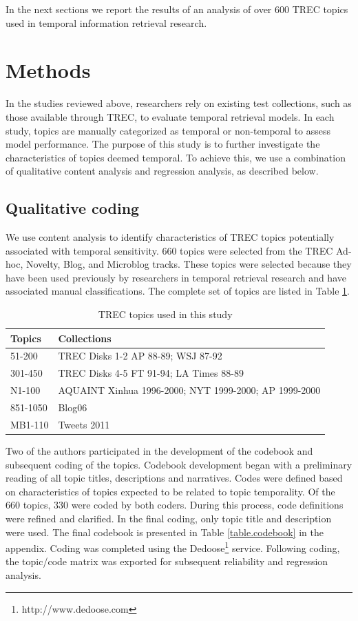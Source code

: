 \documentclass{sig-alternate}
\begin{document}
In the next sections we report the results of an analysis of over 600 TREC topics used in temporal information retrieval research. 

\section{Methods}

In the studies reviewed above, researchers rely on existing test collections, such as those available through TREC, to evaluate temporal retrieval models. In each study, topics are manually categorized as temporal or non-temporal to assess model performance. The purpose of this study is to further investigate the characteristics of topics deemed temporal. To achieve this, we use a combination of qualitative content analysis and regression analysis, as described below.

\subsection{Qualitative coding}
We use content analysis \cite{Krippendorf1980} to identify characteristics of TREC topics potentially associated with temporal sensitivity. 660 topics were selected from the TREC Ad-hoc, Novelty, Blog, and Microblog tracks. These topics were selected because they have been used previously by researchers in temporal retrieval research and have associated manual classifications. The complete set of topics are listed in Table \ref{table.topics}.

\begin{table}
\small
\begin{tabular}{| l |  p{6cm} |} \hline
\bf{Topics} & \bf{Collections}  \\ \hline
51-200 & TREC Disks 1-2 AP 88-89; WSJ 87-92 \\ \hline
301-450 &  TREC Disks 4-5 FT 91-94; LA Times 88-89 \\ \hline
N1-100 & AQUAINT Xinhua 1996-2000; NYT 1999-2000; AP 1999-2000 \\ \hline
851-1050 & Blog06  \\ \hline
MB1-110 & Tweets 2011 \\ \hline
\end{tabular}
\caption{TREC topics used in this study}
\label{table.topics}
\end{table}

Two of the authors participated in the development of the codebook and subsequent coding of the topics. Codebook development began with a preliminary reading of all topic titles, descriptions and narratives. Codes were defined based on characteristics of topics expected to be related to topic temporality. Of the 660 topics, 330 were coded by both coders. During this process, code definitions were refined and clarified. In the final coding, only topic title and description were used. The final codebook is presented in Table \ref{table.codebook} in the appendix. Coding was completed using the Dedoose\footnote{http://www.dedoose.com} service. Following coding, the topic/code matrix was exported for subsequent reliability and regression analysis.
\end{document}
